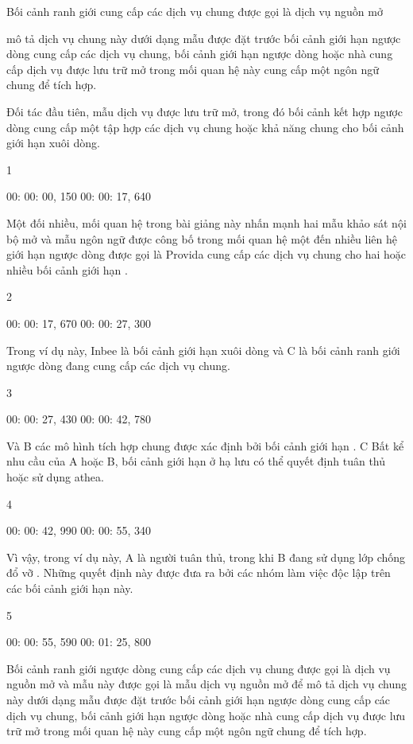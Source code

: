 Bối cảnh ranh giới cung cấp các dịch vụ chung được gọi là dịch vụ nguồn mở

mô tả dịch vụ chung này dưới dạng mẫu được đặt trước bối cảnh giới hạn ngược dòng cung cấp các dịch vụ chung, bối cảnh giới hạn ngược dòng hoặc nhà cung cấp dịch vụ được lưu trữ mở trong mối quan hệ này cung cấp một ngôn ngữ chung để tích hợp.

Đối tác đầu tiên, mẫu dịch vụ được lưu trữ mở, trong đó bối cảnh kết hợp ngược dòng cung cấp một tập hợp các dịch vụ chung hoặc khả năng chung cho bối cảnh giới hạn xuôi dòng.



1

00: 00: 00, 150 00: 00: 17, 640

Một đối nhiều, mối quan hệ trong bài giảng này nhấn mạnh hai mẫu khảo sát nội bộ mở và mẫu ngôn ngữ được công bố trong mối quan hệ một đến nhiều liên hệ giới hạn ngược dòng được gọi là Provida cung cấp các dịch vụ chung cho hai hoặc nhiều bối cảnh giới hạn .

2

00: 00: 17, 670 00: 00: 27, 300

Trong ví dụ này, Inbee là bối cảnh giới hạn xuôi dòng và C là bối cảnh ranh giới ngược dòng đang cung cấp các dịch vụ chung.

3

00: 00: 27, 430 00: 00: 42, 780

Và B các mô hình tích hợp chung được xác định bởi bối cảnh giới hạn . C Bất kể nhu cầu của A hoặc B, bối cảnh giới hạn ở hạ lưu có thể quyết định tuân thủ hoặc sử dụng athea.

4

00: 00: 42, 990 00: 00: 55, 340

Vì vậy, trong ví dụ này, A là người tuân thủ, trong khi B đang sử dụng lớp chống đổ vỡ . Những quyết định này được đưa ra bởi các nhóm làm việc độc lập trên các bối cảnh giới hạn này.

5

00: 00: 55, 590 00: 01: 25, 800

Bối cảnh ranh giới ngược dòng cung cấp các dịch vụ chung được gọi là dịch vụ nguồn mở và mẫu này được gọi là mẫu dịch vụ nguồn mở để mô tả dịch vụ chung này dưới dạng mẫu được đặt trước bối cảnh giới hạn ngược dòng cung cấp các dịch vụ chung, bối cảnh giới hạn ngược dòng hoặc nhà cung cấp dịch vụ được lưu trữ mở trong mối quan hệ này cung cấp một ngôn ngữ chung để tích hợp.

